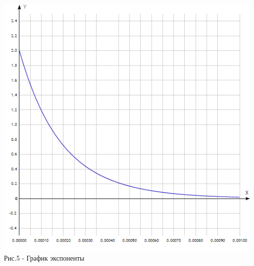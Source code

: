 \documentclass[12pt, a4paper]{report}
\begin{document}
    \begin{center}
        \includegraphics[scale = 1]{photo4.png}\\\bigskip
        Рис.5 - График экспоненты
    \end{center}
\end{document}
